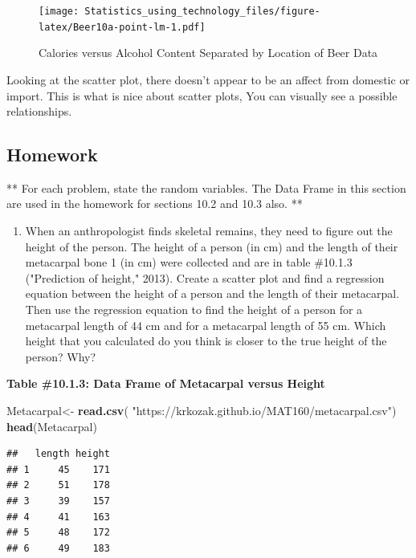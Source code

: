 \documentclass[
]{book}
\newenvironment{Shaded}{\begin{snugshade}}{\end{snugshade}}
\newcommand{\KeywordTok}[1]{\textcolor[rgb]{0.13,0.29,0.53}{\textbf{#1}}}
\newcommand{\NormalTok}[1]{#1}
\newcommand{\StringTok}[1]{\textcolor[rgb]{0.31,0.60,0.02}{#1}}
\providecommand{\tightlist}{%
  \setlength{\itemsep}{0pt}\setlength{\parskip}{0pt}}
\begin{document}
\begin{figure}
\centering
\texttt{[image: Statistics\_using\_technology\_files/figure-latex/Beer10a-point-lm-1.pdf]}
\caption{\label{fig:Beer10a-point-lm}Calories versus Alcohol Content Separated by Location of Beer Data}
\end{figure}

Looking at the scatter plot, there doesn't appear to be an affect from domestic or import. This is what is nice about scatter plots, You can visually see a possible relationships.

\hypertarget{homework}{%
\subsection{Homework}\label{homework}}

** For each problem, state the random variables. The Data Frame in this section are used
in the homework for sections 10.2 and 10.3 also. **

\begin{enumerate}
\def\labelenumi{\arabic{enumi}.}
\tightlist
\item
  When an anthropologist finds skeletal remains, they need to figure out the height of the person. The height of a person (in cm) and the length of their metacarpal bone 1 (in cm) were collected and are in table \#10.1.3 ("Prediction of height," 2013). Create a scatter plot and find a regression equation between the height of a person and the length of their metacarpal. Then use the regression equation to find the height of a person for a metacarpal length of 44 cm and for a metacarpal length of 55 cm. Which height that you calculated do you think is closer to the true height of the person? Why?
\end{enumerate}

\textbf{Table \#10.1.3: Data Frame of Metacarpal versus Height}

\begin{Shaded}
\begin{Highlighting}[]
\NormalTok{Metacarpal<-}\StringTok{ }\KeywordTok{read.csv}\NormalTok{(}
  \StringTok{"https://krkozak.github.io/MAT160/metacarpal.csv"}\NormalTok{)}
\KeywordTok{head}\NormalTok{(Metacarpal)}
\end{Highlighting}
\end{Shaded}

\begin{verbatim}
##   length height
## 1     45    171
## 2     51    178
## 3     39    157
## 4     41    163
## 5     48    172
## 6     49    183
\end{verbatim}
\end{document}
